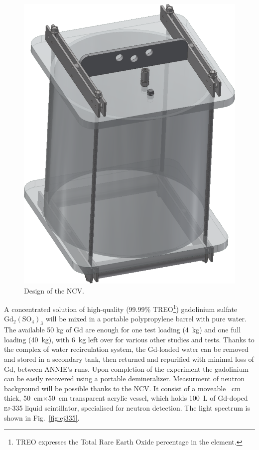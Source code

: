  \begin{figure}
   \centering
   \includegraphics[scale=.15]{pics/ncv}
   \caption{Design of the NCV.}
   \label{fig:ncv}
 \end{figure}

 A concentrated solution of high-quality (99.99\% TREO\footnote{TREO expresses the %
   Total Rare Earth Oxide percentage in the element.}) gadolinium sulfate %
 $\mathrm{Gd}_2(\mathrm{SO}_4)_3$ will be mixed in a portable polypropylene barrel with pure water.
 The available 50 kg of Gd are enough for one test loading (4~kg) and %
 one full loading (40~kg), with 6~kg left over for various other studies and tests.
 Thanks to the complex of water recirculation system, the Gd-loaded water can be removed %
 and stored in a secondary tank, then returned and repurified with minimal loss of Gd, %
 between ANNIE's runs.
 Upon completion of the experiment the gadolinium can be easily recovered using a %
 portable demineralizer.
 Measurment of neutron background will be possible thanks to the NCV.
 It consist of a moveable ~cm thick, 50~cm$\times$50~cm transparent acrylic vessel, %
 which holds 100~L of Gd-doped \textsc{ej-335} liquid scintillator, %
 specialised for neutron detection.
 The light spectrum is shown in Fig.~\ref{fig:ej335}.

